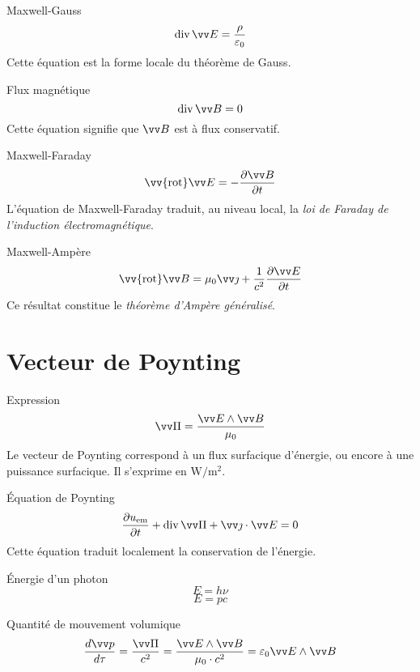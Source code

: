 \documentclass[french, a4paper, 11pt, twocolumn]{article}
\DeclareMathOperator{\diverg}{div}        %
\newcommand{\rota}{\vv{\mathrm{rot}}}    %
\begin{document}
\begin{cadre}{Maxwell-Gauss}
    \[\diverg \vv E = \dfrac{\rho}{\varepsilon_{0}}\]
    \tcblower
    Cette équation est la forme locale du théorème de Gauss.
\end{cadre}

\begin{cadre}{Flux magnétique}
    \[\diverg \vv B = 0\]
    \tcblower
    Cette équation signifie que $\vv B$ est à flux conservatif.
\end{cadre}

\begin{cadre}{Maxwell-Faraday}
  \[\rota \vv E = -\dfrac{\partial \vv B}{\partial t}\]
  \tcblower
  L'équation de Maxwell-Faraday traduit, au niveau local, la \emph{loi de Faraday de l'induction électromagnétique}.
\end{cadre}

\begin{cadre}{Maxwell-Ampère}
    \[\rota \vv B = \mu_{0}\vv\jmath+\dfrac{1}{c^{2}}\dfrac{\partial\vv E}{\partial t}\]
    \tcblower
    Ce résultat constitue le \emph{théorème d'Ampère généralisé}.
\end{cadre}

\section{Vecteur de Poynting}
\begin{cadre}{Expression}
  \[\vv\Pi = \dfrac{\vv E\wedge\vv B}{\mu_{0}}\]
  Le vecteur de Poynting correspond à un flux surfacique d'énergie, ou encore à une puissance surfacique. Il s'exprime en $\si{\watt\per\meter\squared}$.
\end{cadre}

\begin{cadre}{Équation de Poynting}
  \[\dfrac{\partial u_{\text{em}}}{\partial t} + \diverg \vv\Pi + \vv\jmath\cdot\vv E = 0\]
  Cette équation traduit localement la conservation de l'énergie.
\end{cadre}

\begin{cadre}{Énergie d'un photon}
  \[E = h\nu\]
  \[E = pc\]
\end{cadre}

\begin{cadre}{Quantité de mouvement volumique}
  \[\dfrac{d\vv p}{d\tau} = \dfrac{\vv \Pi}{c^{2}} = \dfrac{\vv E \wedge\vv B}{\mu_{0}\cdot c^{2}}=\varepsilon_{0}\vv E\wedge\vv B\]
\end{cadre}
\end{document}
